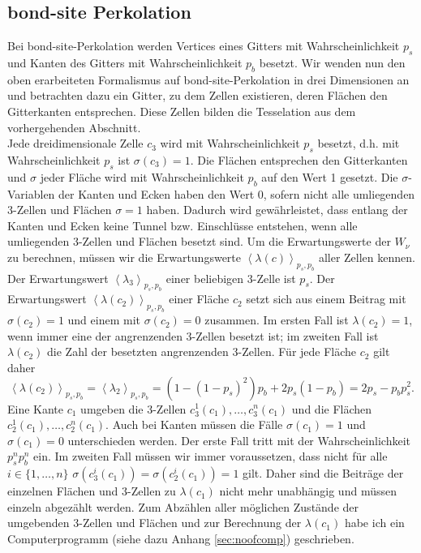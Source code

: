 \subsection{bond-site Perkolation}
\label{sec:bond-site}
Bei bond-site-Perkolation werden Vertices eines Gitters mit Wahrscheinlichkeit $p_s$ und Kanten des Gitters mit Wahrscheinlichkeit $p_b$ besetzt. Wir wenden nun den oben erarbeiteten Formalismus auf bond-site-Perkolation in drei Dimensionen an und betrachten dazu ein Gitter, zu dem Zellen existieren, deren Fl\"achen den Gitterkanten entsprechen. Diese Zellen bilden die Tesselation aus dem vorhergehenden Abschnitt.
\\Jede dreidimensionale Zelle $c_3$ wird mit Wahrscheinlichkeit $p_s$ besetzt, d.h. mit Wahrscheinlichkeit $p_s$ ist $\sigma(c_3)=1$. Die Fl\"achen entsprechen den Gitterkanten und $\sigma$ jeder Fl\"ache wird mit Wahrscheinlichkeit $p_b$ auf den Wert 1 gesetzt. Die $\sigma$-Variablen der Kanten und Ecken haben den Wert 0, sofern nicht alle umliegenden $3$-Zellen und Fl\"achen $\sigma=1$ haben. Dadurch wird gew\"ahrleistet, dass entlang der Kanten und Ecken keine Tunnel bzw. Einschl\"usse entstehen, wenn alle umliegenden $3$-Zellen und Fl\"achen besetzt sind. Um die Erwartungswerte der $W_\nu$ zu berechnen, m\"ussen wir die Erwartungswerte $\left<\lambda(c)\right>_{p_s,p_b}$ aller Zellen kennen.
\\Der Erwartungswert $\left<\lambda_3\right>_{p_s,p_b}$ einer beliebigen $3$-Zelle ist $p_s$. Der Erwartungswert $\left<\lambda(c_2)\right>_{p_s,p_b}$ einer Fl\"ache $c_2$ setzt sich aus einem Beitrag mit $\sigma(c_2)=1$ und einem mit $\sigma(c_2)=0$ zusammen. Im ersten Fall ist $\lambda(c_2)=1$, wenn immer eine der angrenzenden $3$-Zellen besetzt ist; im zweiten Fall ist $\lambda(c_2)$ die Zahl der besetzten angrenzenden $3$-Zellen. F\"ur jede Fl\"ache $c_2$ gilt daher 
\begin{equation}
  \left<\lambda(c_2)\right>_{p_s,p_b}=\left<\lambda_2\right>_{p_s,p_b}=(1-(1-p_s)^2)p_b+2p_s(1-p_b)=2p_s-p_bp_s^2.
\end{equation}
Eine Kante $c_1$ umgeben die $3$-Zellen $c_3^1(c_1),\ldots,c_3^n(c_1)$ und die Fl\"achen $c_2^1(c_1),\ldots,c_2^n(c_1)$. Auch bei Kanten m\"ussen die F\"alle  $\sigma(c_1)=1$ und  $\sigma(c_1)=0$ unterschieden werden. Der erste Fall tritt mit der Wahrscheinlichkeit $p_s^np_b^n$ ein. Im zweiten Fall m\"ussen wir immer voraussetzen, dass nicht f\"ur alle $i\in \{1,\ldots,n\}$  $\sigma(c_3^i(c_1))=\sigma(c_2^i(c_1))=1$ gilt. Daher sind die Beitr\"age der einzelnen Fl\"achen und $3$-Zellen zu $\lambda(c_1)$ nicht mehr unabh\"angig und m\"ussen einzeln abgez\"ahlt werden. Zum Abz\"ahlen aller m\"oglichen Zust\"ande der umgebenden 3-Zellen und Fl\"achen und zur Berechnung der $\lambda(c_1)$ habe ich ein Computerprogramm (siehe dazu Anhang \ref{sec:noofcomp}) geschrieben.  

